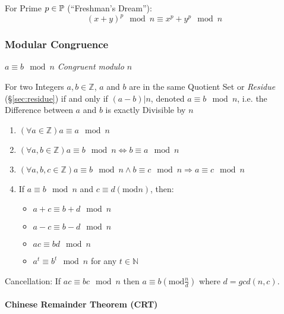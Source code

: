 For Prime $p \in \mathbb{P}$ (``Freshman's Dream''):
\[
  (x+y)^p \mod n \equiv x^p + y^p \mod n
\]



\subsubsection{Modular Congruence}\label{sec:modular_congruence}

$a \equiv b \mod n$ \emph{Congruent modulo $n$}

For two Integers $a,b \in \mathbb{Z}$, $a$ and $b$ are in the same
Quotient Set or \emph{Residue} (\S\ref{sec:residue}) if and only if
$(a - b)|n$, denoted $a \equiv b \mod n$, i.e. the Difference between $a$ and
$b$ is exactly Divisible by $n$

\begin{enumerate}

  \item $(\forall a \in \mathbb{Z}) a \equiv a \mod n$

  \item $(\forall a,b \in \mathbb{Z}) a \equiv b \mod n
    \Leftrightarrow b \equiv a \mod n$

  \item $(\forall a,b,c \in \mathbb{Z}) a \equiv b \mod n
    \wedge b \equiv c \mod n \Rightarrow a \equiv c
    \mod n$

  \item
    If $a \equiv b \mod n$ and $c \equiv d (\mathrm{mod }
    n)$, then:
    \begin{itemize}
    \item $a + c \equiv b + d \mod n$
    \item $a - c \equiv b - d \mod n$
    \item $ac \equiv bd \mod n$
    \item $a^t \equiv b ^t \mod n$ for any $t \in
      \mathbb{N}$
    \end{itemize}

\end{enumerate}

Cancellation: If $ac \equiv bc \mod n$ then $a \equiv b
(\mathrm{mod } \frac{n}{d})$ where $d = gcd(n,c)$.



\paragraph{Chinese Remainder Theorem (CRT)}\label{sec:crt}\hfill

